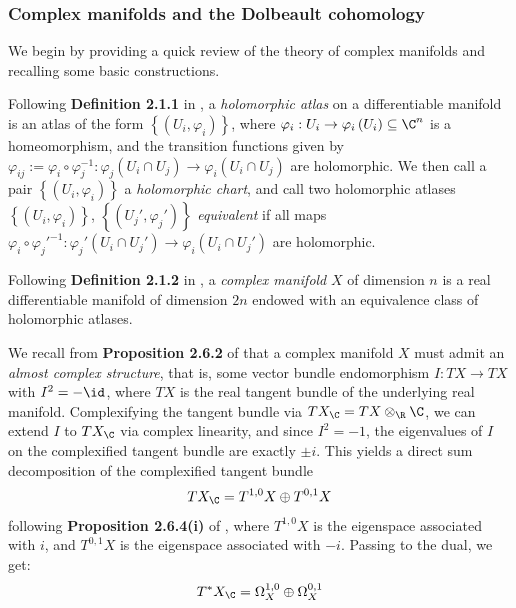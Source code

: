 \subsubsection{Complex manifolds and the Dolbeault cohomology}
We begin by providing a quick review of the theory of complex manifolds and recalling some basic constructions.
\begin{definition}
    Following \textbf{Definition 2.1.1} in \cite{Huybrechts2005}, a \emph{holomorphic atlas} on a differentiable manifold is an atlas of the form $\left\{\left(U_i, \varphi_i\right)\right\}$, where $\varphi_i:U_i\to \varphi_i\left(U_i\right)\subseteq \C^n$ is a homeomorphism, and the transition functions given by $\varphi_{ij}:=\varphi_i\circ \varphi_j^{-1} : \varphi_j\left(U_i\cap U_j\right)\to \varphi_i\left(U_i\cap U_j\right)$ are holomorphic. We then call a pair $\left\{\left(U_i, \varphi_i\right)\right\}$ a \emph{holomorphic chart}, and call two holomorphic atlases $\left\{\left(U_i, \varphi_i\right)\right\}$, $\left\{\left(U_j', \varphi_j'\right)\right\}$ \emph{equivalent} if all maps $\varphi_i\circ \varphi_j'^{-1}: \varphi_j'\left(U_i\cap U_j'\right)\to \varphi_i\left(U_i\cap U_j'\right)$ are holomorphic. 
\end{definition}

\begin{definition}
Following \textbf{Definition 2.1.2} in \cite{Huybrechts2005}, a \emph{complex manifold} $X$ of dimension $n$ is a real differentiable manifold of dimension $2n$ endowed with an equivalence class of holomorphic atlases.
\end{definition}

\noindent We recall from \textbf{Proposition 2.6.2} of \cite{Huybrechts2005} that a complex manifold $X$ must admit an \emph{almost complex structure}, that is, some vector bundle endomorphism $I:TX\to TX$ with $I^2 = -\id$, where $TX$ is the real tangent bundle of the underlying real manifold. Complexifying the tangent bundle via $TX_\C = TX \otimes_\R \C$, we can extend $I$ to $TX_\C$ via complex linearity, and since $I^2=-1$, the eigenvalues of $I$ on the complexified tangent bundle are exactly $\pm i$. This yields a direct sum decomposition of the complexified tangent bundle
$$
TX_\C = T^{1,0}X \oplus T^{0,1}X
$$
following \textbf{Proposition 2.6.4(i)} of \cite{Huybrechts2005}, where $T^{1,0}X$ is the eigenspace associated with $i$, and $T^{0,1}X$ is the eigenspace associated with $-i$. Passing to the dual, we get:
$$
T^*X_\C =\Omega^{1,0}_X \oplus \Omega^{0,1}_X
$$

